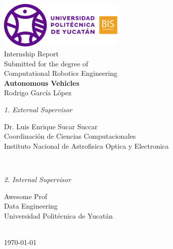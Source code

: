 \begin{titlepage}
	\tgherosfont
	\centering

	\includegraphics[width=6cm]{Figures/logo} \\[2mm]
	\textsf{Internship Report} \\
	\textsf{Submitted for the degree of} \\
	\textsf{Computational Robotics Engineering} \\

	\vfill
	{\LARGE \textbf{Autonomous Vehicles} \\[10mm]}
	{\Large Rodrigo García López} \\

	\vfill
	\begin{minipage}[t]{.27\textwidth}
		\raggedleft
		\textit{1. External Supervisor}
	\end{minipage}
	\hspace*{15pt}
	\begin{minipage}[t]{.65\textwidth}
		{\Large Dr. Luis Enrique Sucar Succar} \\
	  	{\small Coordinación de Ciencias Computacionales} \\[-1mm]
		{\small Instituto Nacional de Astrofisica Optica y Electronica}
	\end{minipage} \\[5mm]
	\begin{minipage}[t]{.27\textwidth}
		\raggedleft
		\textit{2. Internal Supervisor}
	\end{minipage}
	\hspace*{15pt}
	\begin{minipage}[t]{.65\textwidth}
		{\Large Awesome Prof} \\
	  	{\small Data Engineering} \\[-1mm]
		{\small Universidad Politécnica de Yucatán}
	\end{minipage} \\[10mm]

	\today \\

\end{titlepage}
